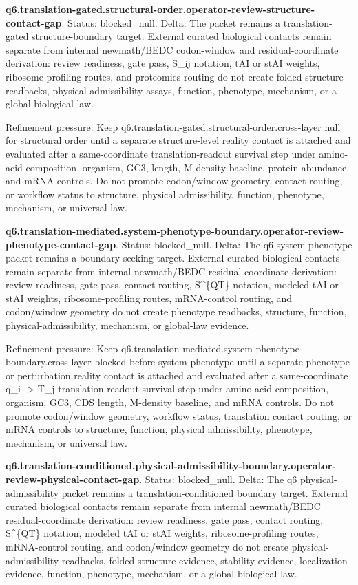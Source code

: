 \textbf{q6.translation-gated.structural-order.operator-review-structure-contact-gap}. Status: blocked\_null. Delta: The packet remains a translation-gated structure-boundary target. External curated biological contacts remain separate from internal newmath/BEDC codon-window and residual-coordinate derivation: review readiness, gate pass, S\_ij notation, tAI or stAI weights, ribosome-profiling routes, and proteomics routing do not create folded-structure readbacks, physical-admissibility assays, function, phenotype, mechanism, or a global biological law.

Refinement pressure: Keep q6.translation-gated.structural-order.cross-layer null for structural order until a separate structure-level reality contact is attached and evaluated after a same-coordinate translation-readout survival step under amino-acid composition, organism, GC3, length, M-density baseline, protein-abundance, and mRNA controls. Do not promote codon/window geometry, contact routing, or workflow status to structure, physical admissibility, function, phenotype, mechanism, or universal law.

\textbf{q6.translation-mediated.system-phenotype-boundary.operator-review-phenotype-contact-gap}. Status: blocked\_null. Delta: The q6 system-phenotype packet remains a boundary-seeking target. External curated biological contacts remain separate from internal newmath/BEDC residual-coordinate derivation: review readiness, gate pass, contact routing, S\textasciicircum{}\{QT\} notation, modeled tAI or stAI weights, ribosome-profiling routes, mRNA-control routing, and codon/window geometry do not create phenotype readbacks, structure, function, physical-admissibility, mechanism, or global-law evidence.

Refinement pressure: Keep q6.translation-mediated.system-phenotype-boundary.cross-layer blocked before system phenotype until a separate phenotype or perturbation reality contact is attached and evaluated after a same-coordinate q\_i -> T\_j translation-readout survival step under amino-acid composition, organism, GC3, CDS length, M-density baseline, and mRNA controls. Do not promote codon/window geometry, workflow status, translation contact routing, or mRNA controls to structure, function, physical admissibility, phenotype, mechanism, or universal law.

\textbf{q6.translation-conditioned.physical-admissibility-boundary.operator-review-physical-contact-gap}. Status: blocked\_null. Delta: The q6 physical-admissibility packet remains a translation-conditioned boundary target. External curated biological contacts remain separate from internal newmath/BEDC residual-coordinate derivation: review readiness, gate pass, contact routing, S\textasciicircum{}\{QT\} notation, modeled tAI or stAI weights, ribosome-profiling routes, mRNA-control routing, and codon/window geometry do not create physical-admissibility readbacks, folded-structure evidence, stability evidence, localization evidence, function, phenotype, mechanism, or a global biological law.

